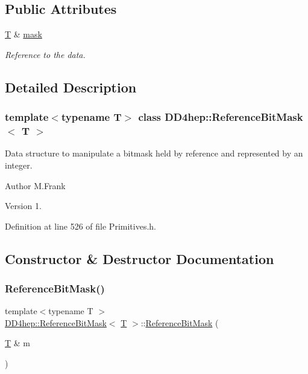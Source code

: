 \subsection*{Public Attributes}
\begin{DoxyCompactItemize}
\item 
\hyperlink{class_t}{T} \& \hyperlink{class_d_d4hep_1_1_reference_bit_mask_aa770625de709649071feac5dc7ac1fc1}{mask}
\begin{DoxyCompactList}\small\item\em Reference to the data. \end{DoxyCompactList}\end{DoxyCompactItemize}


\subsection{Detailed Description}
\subsubsection*{template$<$typename T$>$\newline
class D\+D4hep\+::\+Reference\+Bit\+Mask$<$ T $>$}

Data structure to manipulate a bitmask held by reference and represented by an integer. 

\begin{DoxyAuthor}{Author}
M.\+Frank 
\end{DoxyAuthor}
\begin{DoxyVersion}{Version}
1. 
\end{DoxyVersion}


Definition at line 526 of file Primitives.\+h.



\subsection{Constructor \& Destructor Documentation}
\hypertarget{class_d_d4hep_1_1_reference_bit_mask_abd3539ce53a7879da72da52fadb2b829}{}\label{class_d_d4hep_1_1_reference_bit_mask_abd3539ce53a7879da72da52fadb2b829} 
\subsubsection{\texorpdfstring{Reference\+Bit\+Mask()}{ReferenceBitMask()}}
{\footnotesize\ttfamily template$<$typename T $>$ \\
\hyperlink{class_d_d4hep_1_1_reference_bit_mask}{D\+D4hep\+::\+Reference\+Bit\+Mask}$<$ \hyperlink{class_t}{T} $>$\+::\hyperlink{class_d_d4hep_1_1_reference_bit_mask}{Reference\+Bit\+Mask} (\begin{DoxyParamCaption}\item[{\hyperlink{class_t}{T} \&}]{m }\end{DoxyParamCaption})}



